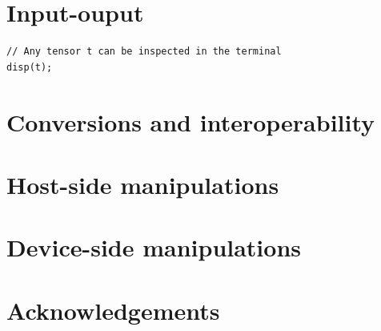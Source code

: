\documentclass[a4paper,landscape,columns=3]{cheatsheet} %
\begin{document}
\section{Input-ouput}
\begin{lstlisting}
// Any tensor t can be inspected in the terminal
disp(t);
\end{lstlisting}


\section{Conversions and interoperability}


\section{Host-side manipulations}


\section{Device-side manipulations}


\section{Acknowledgements}
\cite{utopiagit}



\end{document}
